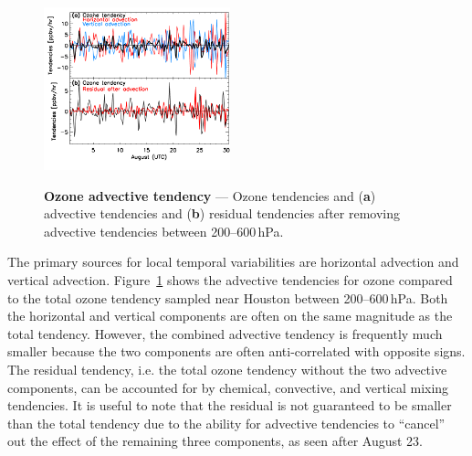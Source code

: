 	\begin{figure}
		\centering
		\begin{singlespacing}
		\vspace{-.2in}
		\label{fig:2006/tend_residual}
		\includegraphics[width=0.48\textwidth]{tendency/residual}
		\caption[Ozone advective tendency]{{\small\textbf{Ozone advective tendency} --- Ozone tendencies and ({\bf a}) advective tendencies
		and ({\bf b}) residual tendencies after removing advective tendencies between 200--600\,\unit{hPa}. \vspace{-.2in}}}
		\end{singlespacing}
	\end{figure}


The primary sources for local temporal variabilities are horizontal advection and vertical advection. Figure~\ref{fig:2006/tend_residual} shows
the advective tendencies for ozone compared to the total ozone tendency sampled near Houston between 200--600\,\unit{hPa}.
Both the horizontal and vertical components are often on the same magnitude as the total tendency. However, the combined
advective tendency is frequently much smaller because the two components are often anti-correlated with opposite signs. The residual
tendency, i.e. the total ozone tendency without the two advective components, can be accounted for by chemical, convective, and
vertical mixing tendencies. It is useful to note that the residual is not guaranteed to be smaller than the total tendency due to the ability for advective tendencies
to ``cancel'' out the effect of the remaining three components, as seen after August 23.

